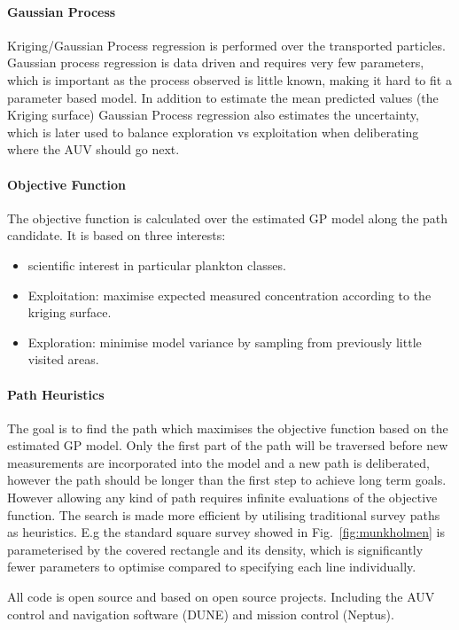 \documentclass[conference]{IEEEtran}
\begin{document}
\paragraph{Gaussian Process}
Kriging/Gaussian Process regression is performed over the transported particles.
Gaussian process regression is data driven and requires very few parameters, which is important as the process observed is little known, making it hard to fit a parameter based model.
In addition to estimate the mean predicted values (the Kriging surface) Gaussian Process regression also estimates the uncertainty, which is later used to balance exploration vs exploitation when deliberating where the AUV should go next.

\paragraph{Objective Function}
The objective function is calculated over the estimated GP model along the path candidate.
It is based on three interests:
\begin{itemize}
    \item scientific interest in particular plankton classes.
    \item Exploitation: maximise expected measured concentration according to the kriging surface.
    \item Exploration: minimise model variance by sampling from previously little visited areas.
\end{itemize}

\paragraph{Path Heuristics}
The goal is to find the path which maximises the objective function based on the estimated GP model.
Only the first part of the path will be traversed before new measurements are incorporated into the model and a new path is deliberated, however the path should be longer than the first step to achieve long term goals.
However allowing any kind of path requires infinite evaluations of the objective function.
The search is made more efficient by utilising traditional survey paths as heuristics. E.g the standard square survey showed in Fig.~\ref{fig:munkholmen} is parameterised by the covered rectangle and its density, which is significantly fewer parameters to optimise compared to specifying each line individually. 

All code is open source and based on open source projects. Including the AUV control and navigation software (DUNE) and mission control (Neptus). 
\end{document}
